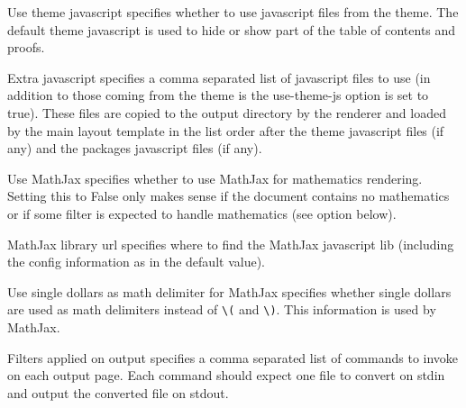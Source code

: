 \begin{configuration}{Use theme javascript}
specifies whether to use javascript files from the theme. The default
theme javascript is used to hide or show part of the table of contents
and proofs.
\end{configuration}

\begin{configuration}{Extra javascript}
specifies a comma separated list of javascript files to use (in addition
to those coming from the theme is the use-theme-js option is set to true).
These files are copied to the output directory by the
renderer and loaded by the main layout template in the list order after
the theme javascript files (if any) and the packages javascript files (if any).
\end{configuration}

\begin{configuration}{Use MathJax}
specifies whether to use MathJax for mathematics rendering. Setting this
to False only makes sense if the document contains no mathematics or if
some filter is expected to handle mathematics (see
 option below).
\end{configuration}

\begin{configuration}{MathJax library url}
specifies where to find the MathJax javascript lib (including the config
information as in the default value).
\end{configuration}

\begin{configuration}{Use single dollars as math delimiter for MathJax}
specifies whether single dollars are used as math delimiters instead of
\verb+\(+ and \verb+\)+. This information is used by MathJax.
\end{configuration}


\begin{configuration}{Filters applied on output}
specifies a comma separated list of commands to invoke on each output
page. Each command should expect one file to convert on stdin and output
the converted file on stdout.
\end{configuration}

